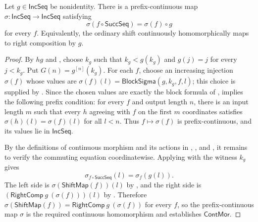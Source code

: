 \begin{lemma}
Let $g\in\mathsf{IncSeq}$ be nonidentity.  There is a prefix-continuous map
$\sigma:\mathsf{IncSeq}\to\mathsf{IncSeq}$ satisfying
\[
\sigma(f\circ\mathsf{SuccSeq})=\sigma(f)\circ g
\]
for every $f$.  Equivalently, the ordinary shift continuously
homomorphically maps to right composition by $g$.
\end{lemma}
\begin{proof}
By $hg$ and , choose $k_g$ such that
$k_g<g(k_g)$ and $g(j)=j$ for every $j<k_g$.  Put
$G(n)=g^{[n]}(k_g)$.  For each $f$, choose an increasing injection
$\sigma(f)$ whose values are
$\sigma(f)(l)=\mathsf{BlockSigma}(g,k_g,f,l)$; this choice is supplied by
.  Since the chosen values are exactly the
block formula of , 
implies the following prefix condition: for every $f$ and output length
$n$, there is an input length $m$ such that every $h$ agreeing with $f$ on
the first $m$ coordinates satisfies
$\sigma(h)(l)=\sigma(f)(l)$ for all $l<n$.  Thus $f\mapsto\sigma(f)$ is
prefix-continuous, and its values lie in $\mathsf{IncSeq}$.

By the definitions of continuous morphism and its actions in
, , and , it remains
to verify the commuting equation coordinatewise.  Applying
 with the witness $k_g$ gives
\[
\sigma_{f\circ\mathsf{SuccSeq}}(l)=\sigma_f(g(l)).
\]
The left side is $\sigma(\mathsf{ShiftMap}(f))(l)$ by
, and the right side is
$(\mathsf{RightComp}\ g\ (\sigma(f)))(l)$ by .
Therefore $\sigma(\mathsf{ShiftMap}(f))=\mathsf{RightComp}\ g\ (\sigma(f))$
for every $f$, so the prefix-continuous map $\sigma$ is the required
continuous homomorphism and establishes $\mathsf{ContMor}$.
\end{proof}
